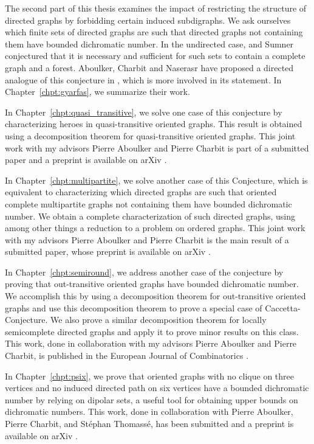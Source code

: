 \bigskip
The second part of this thesis examines the impact of restricting the structure of directed graphs by forbidding certain induced subdigraphs. We ask ourselves which finite sets of directed graphs are such that directed graphs not containing them have bounded dichromatic number. In the undirected case, \Gya and Sumner conjectured that it is necessary and sufficient for such sets to contain a complete graph and a forest. Aboulker, Charbit and Naserasr have proposed a directed analogue of this conjecture in \cite{ACN21}, which is more involved in its statement. In Chapter~\ref{chpt:gyarfas}, we summarize their work.

\medskip
In Chapter~\ref{chpt:quasi_transitive}, we solve one case of this conjecture by characterizing heroes in quasi-transitive oriented graphs. This result is obtained using a decomposition theorem for quasi-transitive oriented graphs. This joint work with my advisors Pierre Aboulker and Pierre Charbit is part of a submitted paper and a preprint is available on arXiv \cite{AACmulti}.

\medskip
In Chapter~\ref{chpt:multipartite}, we solve another case of this Conjecture, which is equivalent to characterizing which directed graphs are such that oriented complete multipartite graphs not containing them have bounded dichromatic number. We obtain a complete characterization of such directed graphs, using among other things a reduction to a problem on ordered graphs. This joint work with my advisors Pierre Aboulker and Pierre Charbit is the main result of a submitted paper, whose preprint is available on arXiv \cite{AACmulti}.

\medskip
In Chapter~\ref{chpt:semiround}, we address another case of the conjecture by proving that out-transitive oriented graphs have  bounded dichromatic number. We accomplish this by using a decomposition theorem for out-transitive oriented graphs and use this decomposition theorem to prove a special case of Caccetta-\Hag Conjecture. We also prove a similar decomposition theorem for locally semicomplete directed graphs and apply it to prove minor results on this class. This work, done in collaboration with my advisors Pierre Aboulker and Pierre Charbit, is published in the European Journal of Combinatorics \cite{AAC21}.

\medskip
In Chapter~\ref{chpt:psix}, we prove that oriented graphs with no clique on three vertices and no induced directed path on six vertices have a bounded dichromatic number by relying on dipolar sets, a useful tool for obtaining upper bounds on dichromatic numbers. This work, done in collaboration with Pierre Aboulker, Pierre Charbit, and Stéphan Thomassé, has been submitted and a preprint is available on arXiv \cite{AACT22}.

